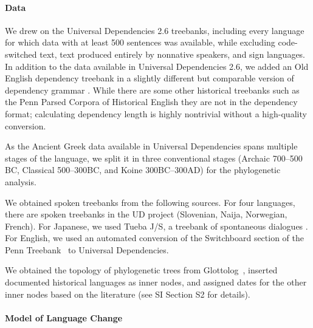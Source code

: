 \documentclass[11pt,a4paper]{article}
\begin{document}



\paragraph{Data}
We drew on the Universal Dependencies 2.6 treebanks, including every language for which data with at least 500 sentences was available, while excluding code-switched text, text produced entirely by nonnative speakers, and sign languages.
In addition to the data available in Universal Dependencies 2.6, we added an Old English dependency treebank in a slightly different but comparable version of dependency grammar \citep{bech2014iswoc}.
While there are some other historical treebanks such as the Penn Parsed Corpora of Historical English \citep{kroch2011penn} they are not in the dependency format; calculating dependency length is highly nontrivial without a high-quality conversion.

As the Ancient Greek data available in Universal Dependencies spans multiple stages of the language, we split it in three conventional stages (Archaic 700--500 BC, Classical 500--300BC, and Koine 300BC--300AD) for the phylogenetic analysis. 


We obtained spoken treebanks from the following sources.
For four languages, there are spoken treebanks in the UD project (Slovenian, Naija, Norwegian, French). For Japanese, we used Tueba J/S, a treebank of spontaneous dialogues \citep{hall2006conll}. For English, we used an automated conversion \citep{schuster2018sentences} of the Switchboard section of the Penn Treebank~\citep{marcus-building-1993} to Universal Dependencies.

We obtained the topology of phylogenetic trees from Glottolog~\citep{nordhoff2011glottolog}, inserted documented historical languages as inner nodes, and assigned dates for the other inner nodes based on the literature (see SI Section S2 for details).




\paragraph{Model of Language Change}

\end{document}
